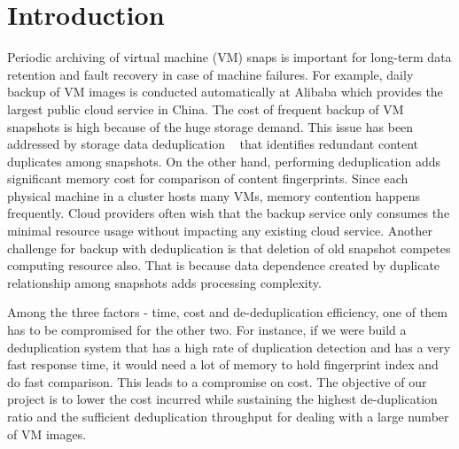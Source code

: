 \section{Introduction}



Periodic  archiving of virtual machine (VM) snaps is important 
for long-term data  retention and fault recovery in case of machine failures.  
For example, daily backup of VM images  is conducted automatically 
at Alibaba which provides the largest public cloud service in China.
The cost of frequent backup of VM snapshots is  high because of the huge storage demand.
This issue has been addressed by   storage data deduplication ~\cite{venti02,bottleneck08} that
identifies redundant content duplicates among snapshots.  On the other hand, performing
deduplication adds significant  memory cost for comparison of content fingerprints. 
Since each physical machine in a cluster  hosts many VMs, memory contention happens frequently. 
Cloud providers often wish that the backup service only consumes  the minimal resource usage without 
impacting any existing cloud service.  Another challenge for backup with deduplication is that deletion 
of old snapshot competes computing resource also. That is because data dependence created 
by duplicate relationship among snapshots  adds processing complexity.

Among the three factors - time, cost and de-deduplication efficiency, one of them has to be compromised for the other two. For instance, if we were build a deduplication system that has a high rate of duplication detection and has a very fast response time, 
it would need a lot of memory to hold fingerprint index and do fast comparison.  This leads to a compromise on cost. 
The objective of our project is to lower the cost incurred while sustaining the highest de-duplication ratio
and  the sufficient deduplication  throughput for dealing with a large number of VM images. 

